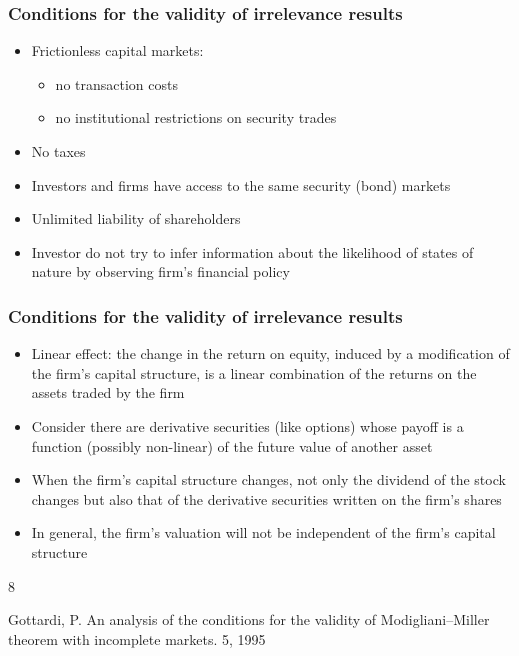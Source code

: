\documentclass[blue]{beamer}
\theoremstyle{definition}
\theoremstyle{example}
\begin{document}

\begin{frame}\frametitle{Conditions for the validity of irrelevance results}

\begin{itemize}
\item Frictionless capital markets:
    \begin{itemize}
    \item no transaction costs
    \item no institutional restrictions on security trades
    \end{itemize}
\item No taxes
\item Investors and firms have access to the same security (bond) markets
\item Unlimited liability of shareholders
\item Investor do not try to infer information about the likelihood of states of nature by observing firm's financial policy
\end{itemize}
\end{frame}


\begin{frame}\frametitle{Conditions for the validity of irrelevance results}

\begin{itemize}
\item Linear effect: the change in the return on equity, induced by a modification of the firm's capital structure, is a linear combination of the returns on
the assets traded by the firm
\item Consider there are derivative securities (like options) whose payoff is a function (possibly non-linear) of the future value of another asset
\item When the firm's capital structure changes, not only the dividend of the stock changes but also that of the derivative securities written on the firm's
shares
\item In general, the firm's valuation will not be independent of the firm's capital structure
\end{itemize}

\begin{thebibliography}{8}


  \beamertemplatearticlebibitems

    Gottardi, P.
    \newblock An analysis of the conditions for the validity of Modigliani--Miller theorem with incomplete markets.
     5, 1995



    \end{thebibliography}

\end{frame}
\end{document}
